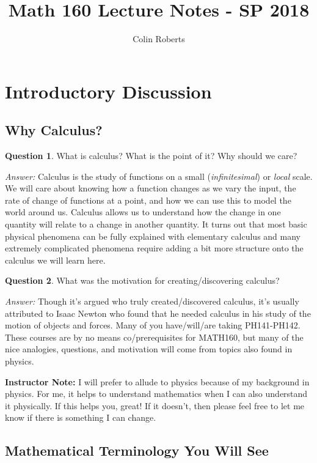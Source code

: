 \documentclass[leqno]{article}
\author{Colin Roberts}
\title{Math 160  Lecture Notes - SP 2018}
\theoremstyle{definition}
\newtheorem{question}{Question}[section]
\theoremstyle{remark}
\theoremstyle{theorem}
\begin{document}
\titlepage
\tableofcontents
\pagebreak

\section{Introductory Discussion}
\subsection{Why Calculus?}
\begin{question}
What is calculus? What is the point of it? Why should we care?
\end{question}

\noindent \emph{Answer:} Calculus is the study of functions on a small (\emph{infinitesimal}) or \emph{local} scale.  We will care about knowing how a function changes as we vary the input, the rate of change of functions at a point, and how we can use this to model the world around us.  Calculus allows us to understand how the change in one quantity will relate to a change in another quantity.  It turns out that most basic physical phenomena can be fully explained with elementary calculus and many extremely complicated phenomena require adding a bit more structure onto the calculus we will learn here.

\begin{question}
What was the motivation for creating/discovering calculus?
\end{question}

\noindent \emph{Answer:} Though it's argued who truly created/discovered calculus, it's usually attributed to Isaac Newton who found that he needed calculus in his study of the motion of objects and forces.  Many of you have/will/are taking PH141-PH142.  These courses are by no means co/prerequisites for MATH160, but many of the nice analogies, questions, and motivation will come from topics also found in physics.

\noindent \textbf{Instructor Note:} I will prefer to allude to physics because of my background in physics.  For me, it helps to understand mathematics when I can also understand it physically.  If this helps you, great! If it doesn't, then please feel free to let me know if there is something I can change.

\subsection{Mathematical Terminology You Will See}
\end{document}
